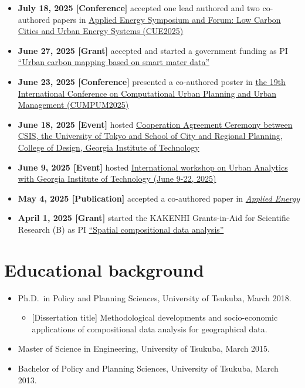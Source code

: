 \documentclass[
]{book}
\providecommand{\tightlist}{%
  \setlength{\itemsep}{0pt}\setlength{\parskip}{0pt}}
\begin{document}
\begin{itemize}
\tightlist
\item
  \textbf{July 18, 2025 {[}Conference{]}} accepted one lead authored and two co-authored papers in \href{https://applied-energy.org/cue2025/index}{Applied Energy Symposium and Forum: Low Carbon Cities and Urban Energy Systems (CUE2025)}
\item
  \textbf{June 27, 2025 {[}Grant{]}} accepted and started a government funding as PI \href{https://www.teitanso.or.jp/smamedata/download/}{``Urban carbon mapping based on smart mater data''}
\item
  \textbf{June 23, 2025 {[}Conference{]}} presented a co-authored poster in \href{https://www.ucl.ac.uk/bartlett/casa/about/cupum-2025}{the 19th International Conference on Computational Urban Planning and Urban Management (CUMPUM2025)}
\item
  \textbf{June 18, 2025 {[}Event{]}} hosted \href{https://www.csis.u-tokyo.ac.jp/news/georgia_tech_agreement_ceremony_202506/}{Cooperation Agreement Ceremony between CSIS, the University of Tokyo and School of City and Regional Planning, College of Design, Georgia Institute of Technology}
\item
  \textbf{June 9, 2025 {[}Event{]}} hosted \href{https://www.csis.u-tokyo.ac.jp/news/georgia_yang_workshop_202506/}{International workshop on Urban Analytics with Georgia Institute of Technology (June 9-22, 2025)}
\item
  \textbf{May 4, 2025 {[}Publication{]}} accepted a co-authored paper in \href{https://www.sciencedirect.com/science/article/pii/S0306261925007974}{\emph{Applied Energy}}
\item
  \textbf{April 1, 2025 {[}Grant{]}} started the KAKENHI Grants-in-Aid for Scientific Research (B) as PI \href{https://kaken.nii.ac.jp/en/grant/KAKENHI-PROJECT-25K00624/}{``Spatial compositional data analysis''}
\end{itemize}

\section*{Educational background}\label{educational-background}

\begin{itemize}
\tightlist
\item
  Ph.D.~in Policy and Planning Sciences, University of Tsukuba, March 2018.

  \begin{itemize}
  \tightlist
  \item
    {[}Dissertation title{]} Methodological developments and socio-economic applications of compositional data analysis for geographical data.
  \end{itemize}
\item
  Master of Science in Engineering, University of Tsukuba, March 2015.
\item
  Bachelor of Policy and Planning Sciences, University of Tsukuba, March 2013.
\end{itemize}
\end{document}
